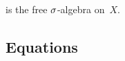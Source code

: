 
\begin{proposition}
    \label{prop:free-algebra-construction-is}
     is the free $\sigma$-algebra on~$X$. %
\end{proposition}

\subsection{Equations}
\label{sec:universal-algebra:equations}

